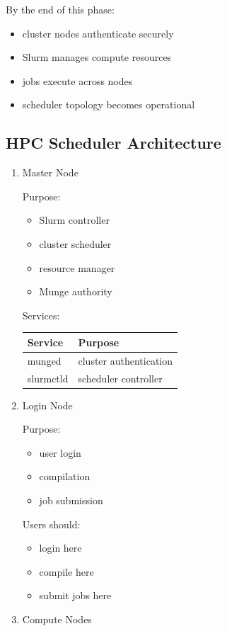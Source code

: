 \documentclass[11pt]{article}
\begin{document}
By the end of this phase:

\begin{itemize}
\item cluster nodes authenticate securely
\item Slurm manages compute resources
\item jobs execute across nodes
\item scheduler topology becomes operational
\end{itemize}
\subsection{HPC Scheduler Architecture}
\label{sec:orga5c9d76}
\begin{enumerate}
\item Master Node
\label{sec:org3df5533}

Purpose:

\begin{itemize}
\item Slurm controller
\item cluster scheduler
\item resource manager
\item Munge authority
\end{itemize}

Services:

\begin{center}
\begin{tabular}{ll}
Service & Purpose\\
\hline
munged & cluster authentication\\
slurmctld & scheduler controller\\
\end{tabular}
\end{center}
\item Login Node
\label{sec:org0f23dfd}

Purpose:

\begin{itemize}
\item user login
\item compilation
\item job submission
\end{itemize}

Users should:

\begin{itemize}
\item login here
\item compile here
\item submit jobs here
\end{itemize}
\item Compute Nodes
\label{sec:orga234d66}


\end{enumerate}
\end{document}
